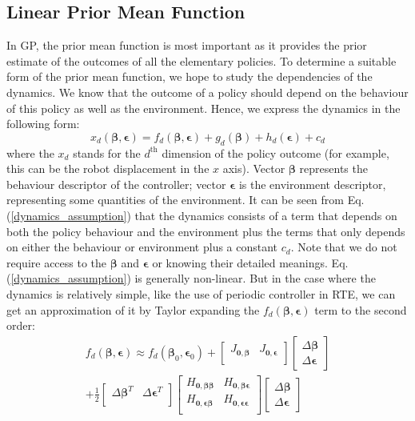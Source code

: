 \subsection{Linear Prior Mean Function}
In GP, the prior mean function is most important as it provides the prior estimate of the outcomes of all the elementary policies.
To determine a suitable form of the prior mean function, we hope to study the dependencies of the dynamics.
We know that the outcome of a policy should depend on the behaviour of this policy as well as the environment.
Hence, we express the dynamics in the following form:
\begin{equation}
x_d(\bm{\beta}, \bm{\epsilon}) = f_d(\bm{\beta}, \bm{\epsilon}) 
+ g_d(\bm{\beta}) 
+ h_d(\bm{\epsilon}) + c_d 
\label{dynamics_assumption}
\end{equation}
where the $x_d$ stands for the $d^{\text{th}}$ dimension of the policy outcome (for example, this can be the robot displacement in the $x$ axis). Vector $\bm{\beta}$ represents the behaviour descriptor of the controller; vector $\bm{\epsilon}$ is the environment descriptor, representing some quantities of the environment. 
It can be seen from Eq. (\ref{dynamics_assumption}) that the dynamics consists of a term that depends on both the policy behaviour and the environment plus the terms that only depends on either the behaviour or environment plus a constant $c_d$.
Note that we do not require access to the $\bm{\beta}$ and $\bm{\epsilon}$ or knowing their detailed meanings.
Eq. (\ref{dynamics_assumption}) is generally non-linear. But in the case where the dynamics is relatively simple, like the use of periodic controller in RTE, we can get an approximation of it by Taylor expanding the $f_d(\bm{\beta}, \bm{\epsilon})$ term to the second order:
\begin{equation}
\begin{gathered}
f_d(\bm{\beta}, \bm{\epsilon}) \approx
f_d(\bm{\beta}_0, \bm{\epsilon}_0) + 
\begin{bmatrix}
J_{\bm{0, \beta}} & J_{\bm{0, \epsilon}} \\
\end{bmatrix}
%
\begin{bmatrix}
\Delta \bm{\beta} \\
\Delta \bm{\epsilon}
\end{bmatrix}
%
\\
%
+ \frac{1}{2}
\begin{bmatrix}
\Delta \bm{\beta}^T & \Delta \bm{\epsilon}^T \\
\end{bmatrix}
%
\begin{bmatrix}
H_{\bm{0, \beta \beta}} & H_{\bm{0}, \bm{\beta \epsilon}} \\
H_{\bm{0, \epsilon \beta}} & H_{\bm{0, \epsilon \epsilon}} \\
\end{bmatrix}
%
\begin{bmatrix}
\Delta \bm{\beta} \\
\Delta \bm{\epsilon}
\end{bmatrix}
\end{gathered}
\label{Taylor_expansion}
\end{equation}
